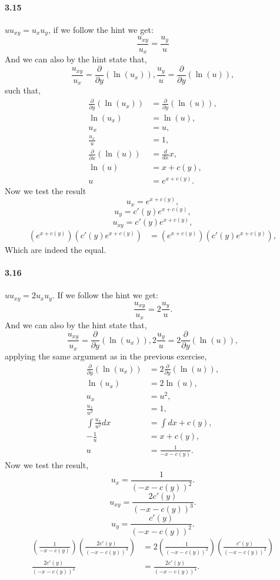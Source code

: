 \documentclass{article}
\begin{document}
\paragraph{3.15} $u u_{xy}=u_xu_y$, if we follow the hint we get:
$$\frac{u_{xy}}{u_x} = \frac{u_y}{u}$$
And we can also  by the hint state that,
$$\frac{u_{xy}}{u_x} = \frac{\partial}{\partial y}(\ln (u_x)), \frac{u_y}{u} = \frac{\partial}{\partial y}(\ln (u)),$$
such that,
\begin{align*}
\frac{\partial}{\partial y}(\ln (u_x)) &= \frac{\partial}{\partial y}(\ln (u)),\\
\ln (u_x) &= \ln (u),\\
u_x &= u,\\
\frac{u_x}{u} &= 1,\\
\frac{\partial}{\partial x} (\ln (u)) &= \frac{d}{dx} x,\\
\ln (u) &= x + c(y),\\
u &= e^{x + c(y)}.
\end{align*}
Now we test the result
$$u_x = e^{x + c(y)},$$
$$u_y = c'(y)e^{x + c(y)},$$
$$u_{xy} = c'(y)e^{x + c(y)},$$
\begin{align*}
(e^{x + c(y)})(c'(y)e^{x + c(y)}) &= (e^{x + c(y)})(c'(y)e^{x + c(y)}), 
\end{align*}
Which are indeed the equal.
\paragraph{3.16} $u u_{xy}= 2u_xu_y$. If we follow the hint we get:
$$\frac{u_{xy}}{u_x} = 2\frac{u_y}{u}.$$
And we can also  by the hint state that,
$$\frac{u_{xy}}{u_x} = \frac{\partial}{\partial y}(\ln (u_x)), 2\frac{u_y}{u} = 2\frac{\partial}{\partial y}(\ln (u)),$$
applying the same argument as in the previous exercise,
\begin{align*}
\frac{\partial}{\partial y}(\ln (u_x)) &= 2\frac{\partial}{\partial y}(\ln (u)),\\
\ln (u_x) &= 2\ln (u),\\
u_x &= u^2,\\
\frac{u_x}{u^2} &= 1,\\
\int \frac{u_x}{u^2} dx &= \int dx + c(y),\\
- \frac{1}{u} &= x + c(y),\\
u &= \frac{1}{- x - c(y)}.
\end{align*}
Now we test the result,
$$u_x = \frac{1}{(-x-c(y))^2}.$$
$$u_{xy} = \frac{2c'(y)}{(-x-c(y))^3}.$$
$$u_y = \frac{c'(y)}{(-x-c(y))^2}.$$
\begin{align*}
	\left(\frac{1}{- x - c(y)}\right) \left(\frac{2c'(y)}{(-x-c(y))^3}\right) &= 2\left(\frac{1}{(-x-c(y))^2}\right) \left(\frac{c'(y)}{(-x-c(y))^2}\right)\\
	\frac{2c'(y)}{(-x-c(y))^4} &= \frac{2c'(y)}{(-x-c(y))^4}.
\end{align*}
\end{document}
